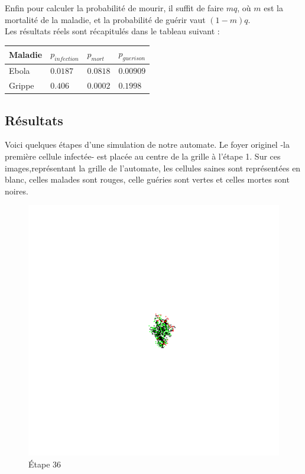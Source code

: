 \documentclass{article}
\begin{document}
Enfin pour calculer la probabilité de mourir, il suffit de faire $mq$, où $m$ est la mortalité de la maladie, et la probabilité de guérir vaut $(1-m)q$. \\
Les résultats réels sont récapitulés dans le tableau suivant :

\begin{tabular} {| p{2cm} | p{2cm}| p{2cm} | p{2cm} |}
	\hline
	Maladie & $p_{infection}$ & $p_{mort}$ & $p_{guerison}$ \\ \hline
	Ebola & $0.0187$ & $0.0818$ & $0.00909$ \\ \hline
	Grippe & $0.406$ & $0.0002$ & $0.1998$ \\
	\hline
\end{tabular}

\subsection{Résultats}

Voici quelques étapes d'une simulation de notre automate. Le foyer originel -la première cellule infectée- est placée au centre de la grille à l'étape 1. Sur ces images,représentant la grille de l'automate, les cellules saines sont représentées en blanc, celles malades sont rouges, celle guéries sont vertes et celles mortes sont noires.

\begin{figure}[hbtp]
\centering
\includegraphics[scale=0.22]{../images/Frame-36.png}
\caption{Étape 36}
\end{figure}
\end{document}
